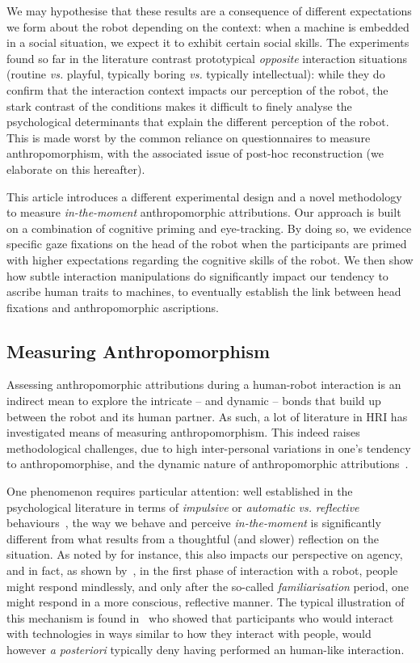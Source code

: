 \documentclass[lettersize, noapacite, twoside, HRI]{apa_HRI}
\newcommand{\vs}{\textit{vs.}\xspace}
\begin{document}
We may hypothesise that these results are a consequence of different
expectations we form about the robot depending on the context: when a machine is
embedded in a social situation, we expect it to exhibit certain
social skills. The experiments found so far in the literature contrast prototypical
\emph{opposite} interaction situations (routine \vs playful, typically boring \vs typically
intellectual): while they do confirm that the interaction context impacts our
perception of the robot, the stark contrast of the conditions makes it difficult
to finely analyse the psychological determinants that explain the different
perception of the robot. This is made worst by the common reliance on
questionnaires to measure anthropomorphism, with the associated issue of
post-hoc reconstruction (we elaborate on this hereafter).

This article introduces a different experimental design and a novel methodology
to measure \emph{in-the-moment} anthropomorphic attributions.  Our approach is
built on a combination of cognitive priming and eye-tracking. By doing so, we
evidence specific gaze fixations on the head of the robot when the participants
are primed with higher expectations regarding the cognitive skills of the robot.
We then show how subtle interaction manipulations do significantly impact our
tendency to ascribe human traits to machines, to eventually establish the link
between head fixations and anthropomorphic ascriptions.

\subsection{Measuring Anthropomorphism}

Assessing anthropomorphic attributions during a human-robot interaction is an
indirect mean to explore the intricate -- and dynamic -- bonds that build up
between the robot and its human partner. As such, a lot of literature in HRI has
investigated means of measuring anthropomorphism. This indeed raises 
methodological challenges, due to high inter-personal variations in
one's tendency to anthropomorphise, and the dynamic nature of
anthropomorphic attributions~\citep{lemaignan2014dynamics}.

One phenomenon requires particular attention: well established in the
psychological literature in terms of \emph{impulsive} or \emph{automatic} \vs
\emph{reflective} behaviours~\citep{strack2004reflective}, the way we behave and
perceive \emph{in-the-moment} is significantly different from what results from
a thoughtful (and slower) reflection on the situation. As noted by
\citet{takayama_perspectives_2012} for instance, this also impacts our
perspective on agency, and in fact, as shown by~\citet{nass_machines_2000}, in
the first phase of interaction with a robot, people might respond mindlessly,
and only after the so-called \emph{familiarisation} period, one might respond in
a more conscious, reflective manner. The typical illustration of this mechanism
is found in~\citet{reeves_media_1996} who showed that participants who would
interact with technologies in ways similar to how they interact with people,
would however {\it a posteriori} typically deny having performed an human-like
interaction.
\end{document}
